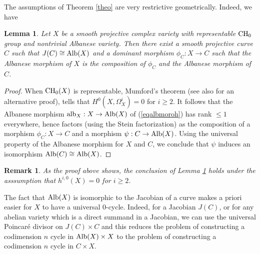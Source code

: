 \documentclass[10pt]{article}
\newtheorem{lemm}[theo]{Lemma}
\newtheorem{rema}[theo]{Remark}
\begin{document}
The assumptions of Theorem \ref{theo} are very restrictive geometrically. Indeed, we have
   \begin{lemm} \label{lestructure} Let $X$ be a smooth projective complex variety  with representable ${\rm CH}_0$ group and nontrivial Albanese variety. Then there exist a smooth projective curve $C$ such that $J(C)\cong {\rm Alb}(X)$ and a dominant morphism $\phi_C: X\rightarrow C$ such that the Albanese morphism of $X$ is the composition of $\phi_C$ and the Albanese morphism of $C$.
   \end{lemm}
\begin{proof} When ${\rm CH}_0(X)$ is representable, Mumford's theorem \cite{mumford} (see also \cite{blochsri} for an alternative proof), tells that $H^0(X,\Omega_X^i)=0$ for $i\geq 2$. It follows that the Albanese morphism
${\rm alb}_X: X\rightarrow {\rm Alb}(X)$ of (\ref{eqalbmoroh}) has rank $\leq 1$ everywhere, hence factors (using the Stein factorization) as the composition of a morphism $\phi_C: X\rightarrow C$ and a morphism $\psi: C\rightarrow {\rm Alb}(X)$. Using the universal property of the Albanese morphism for $X$ and $C$, we conclude that
$\psi$ induces an isomorphism ${\rm Alb}(C)\cong {\rm Alb}(X)$.
\end{proof}
\begin{rema}{\rm As the proof above  shows, the conclusion  of Lemma \ref{lestructure} holds under the asssumption that $h^{i,0}(X)=0$ for $i\geq 2$.}
\end{rema}
The fact that ${\rm Alb}(X)$ is isomorphic to the Jacobian of a curve makes a priori easier for $X$ to have a universal $0$-cycle. Indeed, for a Jacobian $J(C)$, or for any abelian variety which is a direct summand in a Jacobian, we can use  the universal Poincar\'{e} divisor on $J(C)\times C$ and this reduces the problem of constructing a codimension $n$ cycle in ${\rm Alb}(X)\times X$ to the problem of constructing a codimension $n$ cycle in $C\times X$.
\end{document}
